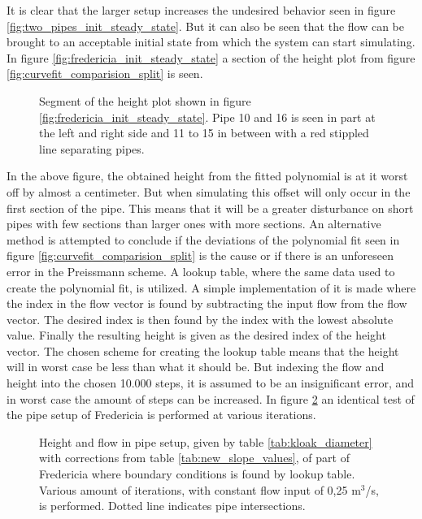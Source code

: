 It is clear that the larger setup increases the undesired behavior seen in figure \ref{fig:two_pipes_init_steady_state}. But it can also be seen that the flow can be brought to an acceptable initial state from which the system can start simulating. In figure \ref{fig:fredericia_init_steady_state} a section of the height plot from figure \ref{fig:curvefit_comparision_split} is seen. 

\begin{figure}[H]
 \centering
 
\caption{Segment of the height plot shown in figure \ref{fig:fredericia_init_steady_state}. Pipe 10 and 16 is seen in part at the left and right side and 11 to 15 in between with a red stippled line separating pipes.}
\label{fig:fredericia_init_steady_state_zoom}
\end{figure}

In the above figure, the obtained height from the fitted polynomial is at it worst off by almost a centimeter. But when simulating this offset will only occur in the first section of the pipe. This means that it will be a greater disturbance on short pipes with few sections than larger ones with more sections. An alternative method is attempted to conclude if the deviations of the polynomial fit seen in figure \ref{fig:curvefit_comparision_split} is the cause or if there is an unforeseen error in the Preissmann scheme. A lookup table, where the same data used to create the polynomial fit, is utilized. A simple implementation of it is made where the index in the flow vector is found by subtracting the input flow from the flow vector. The desired index is then found by the index with the lowest absolute value. Finally the resulting height is given as the desired index of the height vector. The chosen scheme for creating the lookup table means that the height will in worst case be less than what it should be. But indexing the flow and height into the chosen 10.000 steps, it is assumed to be an insignificant error, and in worst case the amount of steps can be increased. In figure \ref{fig:fredericia_init_steady_state_lut} an identical test of the pipe setup of Fredericia is performed at various iterations.      

\begin{figure}[H]
 \centering
 
\caption{Height and flow in pipe setup, given by table \ref{tab:kloak_diameter} with corrections from table \ref{tab:new_slope_values}, of part of Fredericia where boundary conditions is found by lookup table. Various amount of iterations, with constant flow input of 0,25 $\text{m}^\text{3}$/s, is performed. Dotted line indicates pipe intersections.}
\label{fig:fredericia_init_steady_state_lut}
\end{figure}

